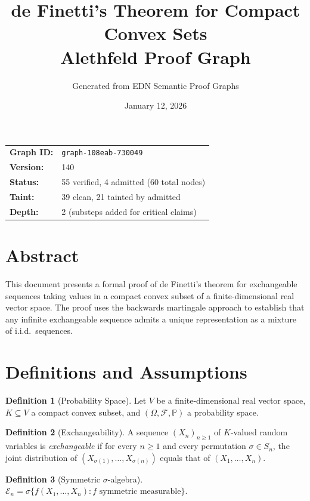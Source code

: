 \documentclass[11pt,a4paper]{article}
\title{\textbf{de Finetti's Theorem for Compact Convex Sets}\\[0.3em]
{\normalsize Alethfeld Proof Graph}}
\author{Generated from EDN Semantic Proof Graphs}
\date{January 12, 2026}
\theoremstyle{definition}
\newtheorem{definition}{Definition}[section]
\theoremstyle{plain}
\begin{document}
\maketitle

\begin{center}
\begin{tabular}{ll}
\textbf{Graph ID:} & \texttt{graph-108eab-730049} \\
\textbf{Version:} & 140 \\
\textbf{Status:} & 55 verified, 4 admitted (60 total nodes) \\
\textbf{Taint:} & 39 clean, 21 tainted by admitted \\
\textbf{Depth:} & 2 (substeps added for critical claims) \\
\end{tabular}
\end{center}

\section*{Abstract}

This document presents a formal proof of de Finetti's theorem for exchangeable sequences taking values in a compact convex subset of a finite-dimensional real vector space. The proof uses the backwards martingale approach to establish that any infinite exchangeable sequence admits a unique representation as a mixture of i.i.d.\ sequences.

\section{Definitions and Assumptions}

\begin{definition}[Probability Space]
Let $V$ be a finite-dimensional real vector space, $K \subseteq V$ a compact convex subset, and $(\Omega, \mathcal{F}, \mathbb{P})$ a probability space.
\end{definition}

\begin{definition}[Exchangeability]
A sequence $(X_n)_{n \geq 1}$ of $K$-valued random variables is \emph{exchangeable} if for every $n \geq 1$ and every permutation $\sigma \in S_n$, the joint distribution of $(X_{\sigma(1)}, \ldots, X_{\sigma(n)})$ equals that of $(X_1, \ldots, X_n)$.
\end{definition}

\begin{definition}[Symmetric $\sigma$-algebra]
$\mathcal{E}_n = \sigma\{f(X_1, \ldots, X_n) : f \text{ symmetric measurable}\}$.
\end{definition}
\end{document}
